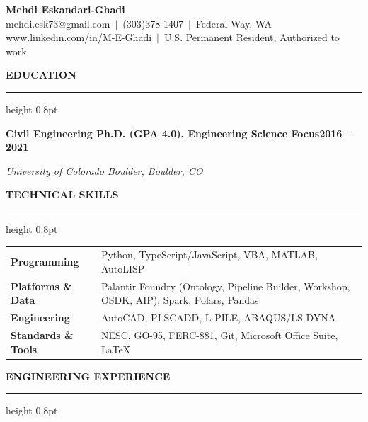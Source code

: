 \documentclass[10pt, letterpaper]{article}
\newcommand{\rsection}[1]{%
  \vspace{8pt}%
  {\large\bfseries\MakeUppercase{#1}}%
  \vspace{1pt}%
  \hrule height 0.8pt%
  \vspace{4pt}%
}
\newcommand{\jobline}[2]{%
  \vspace{5pt}%
  \noindent\textbf{#1}\hfill\textbf{#2}\par%
  \vspace{1pt}%
}
\newcommand{\subline}[1]{%
  \vspace{-1pt}%
  \noindent\textit{#1}\par%
  \vspace{1pt}%
}
\begin{document}
\pagestyle{empty}

\begin{center}
  {\LARGE\bfseries Mehdi Eskandari-Ghadi}\\[4pt]
  mehdi.esk73@gmail.com\ $|$\ (303)378-1407\ $|$\ Federal Way, WA\\[2pt]
  \href{http://www.linkedin.com/in/M-E-Ghadi}{www.linkedin.com/in/M-E-Ghadi}\ $|$\
  U.S. Permanent Resident, Authorized to work
\end{center}

\vspace{2pt}

\rsection{Education}

\jobline{Civil Engineering Ph.D. (GPA 4.0), Engineering Science Focus}{2016 -- 2021}
\subline{University of Colorado Boulder, Boulder, CO}

\rsection{Technical Skills}

\vspace{2pt}
\begin{tabular}{@{}p{4cm}p{13cm}@{}}
  \textbf{Programming}       & Python, TypeScript/JavaScript, VBA, MATLAB, AutoLISP \\[2pt]
  \textbf{Platforms \& Data} & Palantir Foundry (Ontology, Pipeline Builder, Workshop, OSDK, AIP), Spark, Polars, Pandas \\[2pt]
  \textbf{Engineering}       & AutoCAD, PLSCADD, L-PILE, ABAQUS/LS-DYNA \\[2pt]
  \textbf{Standards \& Tools} & NESC, GO-95, FERC-881, Git, Microsoft Office Suite, LaTeX \\
\end{tabular}

\rsection{Engineering Experience}
\end{document}
